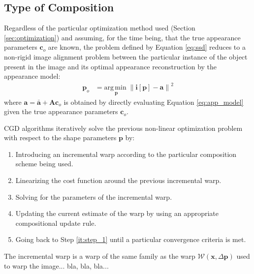 \subsection{Type of Composition}
\label{sec:composition}

Regardless of the particular optimization method used (Section \ref{sec:optimization}) and assuming, for the time being, that the true appearance parameters $\mathbf{c}_o$ are known, the problem defined by Equation \ref{eq:ssd} reduces to a non-rigid image alignment problem \cite{Baker2004, Munoz2014} between the particular instance of the object present in the image and its optimal appearance reconstruction by the appearance model:
\begin{equation}
    \begin{aligned}
        \mathbf{p}_o & = \underset{\mathbf{p}}{\mathrm{arg\,min\;}} 
        \left\| \mathbf{i}[\mathbf{p}] - \mathbf{a} \right\|^2 
    \label{eq:ssd_shape}
    \end{aligned}
\end{equation}
where $\mathbf{a} = \bar{\mathbf{a}} + \mathbf{A} \mathbf{c}_o$ is obtained by directly evaluating Equation \ref{eq:app_model} given the true appearance parameters $\mathbf{c}_o$.

CGD algorithms iteratively solve the previous non-linear optimization problem with respect to the shape parameters $\mathbf{p}$ by:
\begin{enumerate}
    \item Introducing an incremental warp according to the particular composition scheme being used.
    \label{it:step_1}
    
    \item Linearizing the cost function around the previous incremental warp.
    \label{it:step_2}
    
    \item Solving for the parameters of the incremental warp.
    \label{it:step_3}

    \item Updating the current estimate of the warp by using an appropriate compositional update rule.
    \label{it:step_4}

    \item Going back to Step \ref{it:step_1} until a particular convergence criteria is met.
    \label{it:step_5}
\end{enumerate}

The incremental warp is a warp of the same family as the warp $\mathcal{W}(\mathbf{x}, \Delta \mathbf{p})$ used to warp the image... bla, bla, bla...


